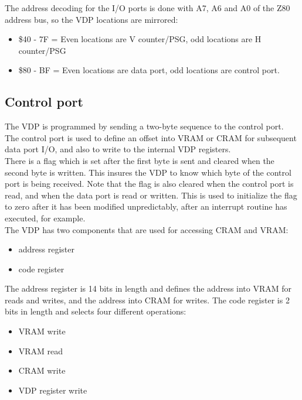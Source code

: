 \documentclass{article}
\begin{document}
The address decoding for the I/O ports is done with A7, A6 and A0 of the Z80
address bus, so the VDP locations are mirrored:

\begin{itemize}
    \item \$40 - 7F = Even locations are V counter/PSG, odd locations are H counter/PSG
    \item \$80 - BF = Even locations are data port, odd locations are control port.
\end{itemize}


\subsection{Control port}

The VDP is programmed by sending a two-byte sequence to the control port. The
control port is used to define an offset into VRAM or CRAM for subsequent data
port I/O, and also to write to the internal VDP registers.
\\

There is a flag which is set after the first byte is sent and cleared when the
second byte is written. This insures the VDP to know which byte of the control
port is being received. Note that the flag is also cleared when the control
port is read, and when the data port is read or written. This is used to
initialize the flag to zero after it has been modified unpredictably, after an
interrupt routine has executed, for example.
\\

The VDP has two components that are used for accessing CRAM and VRAM:

\begin{itemize}
    \item address register
    \item code register
\end{itemize}

The address register is 14 bits in length and defines the address into VRAM
for reads and writes, and the address into CRAM for writes. The code register
is 2 bits in length and selects four different operations:

\begin{itemize}
    \item VRAM write
    \item VRAM read
    \item CRAM write
    \item VDP register write
\end{itemize}
\end{document}
